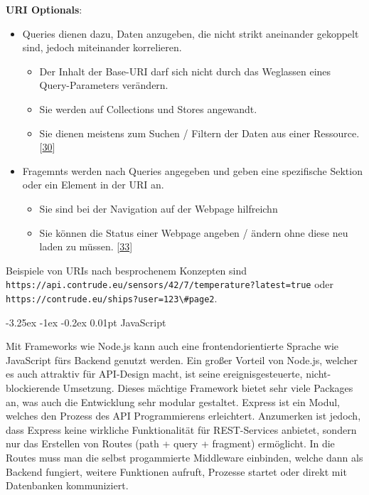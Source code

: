 \documentclass[
    headings=optiontotocandhead,%
    twoside,
    numbers=noenddot,%
    12pt, %
    titlepage, %
    parskip=full, %
    listof=leveldown, 
    numbers=noenddot, %
    a4paper,DIV=14,
    BCOR=15mm,
]{scrbook}
\makeatletter
\newcommand{\passthrough}[1]{#1}
\providecommand{\tightlist}{%
  \setlength{\itemsep}{0pt}\setlength{\parskip}{0pt}}
\renewcommand\paragraph{\@startsection{paragraph}{4}{\z@}%
    {-3.25ex \@plus -1ex \@minus -0.2ex}%
    {0.01pt}%
    {\raggedsection\normalfont\sectfont\nobreak\size@paragraph}%
  }
\makeatother
\begin{document}
\textbf{URI Optionals}:

\begin{itemize}
\tightlist
\item
  Queries dienen dazu, Daten anzugeben, die nicht strikt aneinander
  gekoppelt sind, jedoch miteinander korrelieren.

  \begin{itemize}
  \tightlist
  \item
    Der Inhalt der Base-URI darf sich nicht durch das Weglassen eines
    Query-Parameters verändern.
  \item
    Sie werden auf Collections und Stores angewandt.
  \item
    Sie dienen meistens zum Suchen / Filtern der Daten aus einer
    Ressource.
    {[}\protect\hyperlink{ref-REST-API-Design-Rulebook}{30}{]}
  \end{itemize}
\item
  Fragemnts werden nach Queries angegeben und geben eine spezifische
  Sektion oder ein Element in der URI an.

  \begin{itemize}
  \tightlist
  \item
    Sie sind bei der Navigation auf der Webpage hilfreichn
  \item
    Sie können die Status einer Webpage angeben / ändern ohne diese neu
    laden zu müssen.
    {[}\protect\hyperlink{ref-medium-uri-fragment}{33}{]}
  \end{itemize}
\end{itemize}

Beispiele von URIs nach besprochenem Konzepten sind
\passthrough{\lstinline!https://api.contrude.eu/sensors/42/7/temperature?latest=true!}
oder
\passthrough{\lstinline!https://contrude.eu/ships?user=123\#page2!}.

\hypertarget{javascript}{%
\paragraph{JavaScript}\label{javascript}}

Mit Frameworks wie Node.js kann auch eine frontendorientierte Sprache
wie JavaScript fürs Backend genutzt werden. Ein großer Vorteil von
Node.js, welcher es auch attraktiv für API-Design macht, ist seine
ereignisgesteuerte, nicht-blockierende Umsetzung. Dieses mächtige
Framework bietet sehr viele Packages an, was auch die Entwicklung sehr
modular gestaltet. Express ist ein Modul, welches den Prozess des API
Programmierens erleichtert. Anzumerken ist jedoch, dass Express keine
wirkliche Funktionalität für REST-Services anbietet, sondern nur das
Erstellen von Routes (path + query + fragment) ermöglicht. In die Routes
muss man die selbst progammierte Middleware einbinden, welche dann als
Backend fungiert, weitere Funktionen aufruft, Prozesse startet oder
direkt mit Datenbanken kommuniziert.
\end{document}
